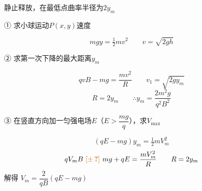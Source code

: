 \begin{problem}
静止释放，在最低点曲率半径为$2y_m$ %

① 求小球运动$P(x,y)$速度
\begin{solution}
\[ mgy=\tfrac12mv^2\qquad v=\sqrt{2gh} \]
\end{solution}
② 求第一次下降的最大距离$y_m$
\begin{solution}
\[ qvB-mg=\frac{mv^2}{R}\qquad v_1=\sqrt{2gy_m} \]
\[ R=2y_m\qquad \therefore y_m=\frac{2m^2g}{q^2B^2} \]
\end{solution}
③ 在竖直方向加一匀强电场$E$（$E>\dfrac{mg}{q}$），求$V_{\max}$ %
\begin{solution}
\[ (qE-mg)y_m=\tfrac12mV_m^2 \]
\[ qV_mB\ \unclear{\pm}\ mg+qE=\frac{mV_m^2}{R}\qquad R=2y_m \] %
解得 $V_m=\dfrac{2}{qB}(qE-mg)$
\end{solution}
\end{problem}

